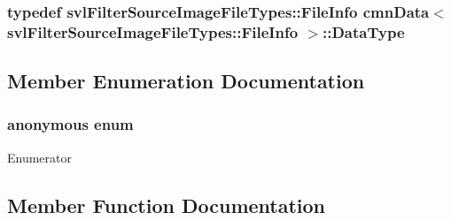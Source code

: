 \subsubsection[{Data\+Type}]{\setlength{\rightskip}{0pt plus 5cm}typedef {\bf svl\+Filter\+Source\+Image\+File\+Types\+::\+File\+Info} {\bf cmn\+Data}$<$ {\bf svl\+Filter\+Source\+Image\+File\+Types\+::\+File\+Info} $>$\+::{\bf Data\+Type}}\label{classcmn_data_3_01svl_filter_source_image_file_types_1_1_file_info_01_4_a7f361877e8e81eb1bc2e3b091eb5f7a9}


\subsection{Member Enumeration Documentation}
\hypertarget{classcmn_data_3_01svl_filter_source_image_file_types_1_1_file_info_01_4_aadcd21e92cd06c6edfc10bdb21755f71}{}\subsubsection[{anonymous enum}]{\setlength{\rightskip}{0pt plus 5cm}anonymous enum}\label{classcmn_data_3_01svl_filter_source_image_file_types_1_1_file_info_01_4_aadcd21e92cd06c6edfc10bdb21755f71}
\begin{Desc}
\item[Enumerator]\par
\begin{description}
\item[{\em 
\hypertarget{classcmn_data_3_01svl_filter_source_image_file_types_1_1_file_info_01_4_aadcd21e92cd06c6edfc10bdb21755f71af3dc5aa1649ab709ce8e3af7ba3a87ca}{}I\+S\+\_\+\+S\+P\+E\+C\+I\+A\+L\+I\+Z\+E\+D\label{classcmn_data_3_01svl_filter_source_image_file_types_1_1_file_info_01_4_aadcd21e92cd06c6edfc10bdb21755f71af3dc5aa1649ab709ce8e3af7ba3a87ca}
}]\end{description}
\end{Desc}


\subsection{Member Function Documentation}
\hypertarget{classcmn_data_3_01svl_filter_source_image_file_types_1_1_file_info_01_4_af24434c132943365197cccaf8b7020e7}{}
